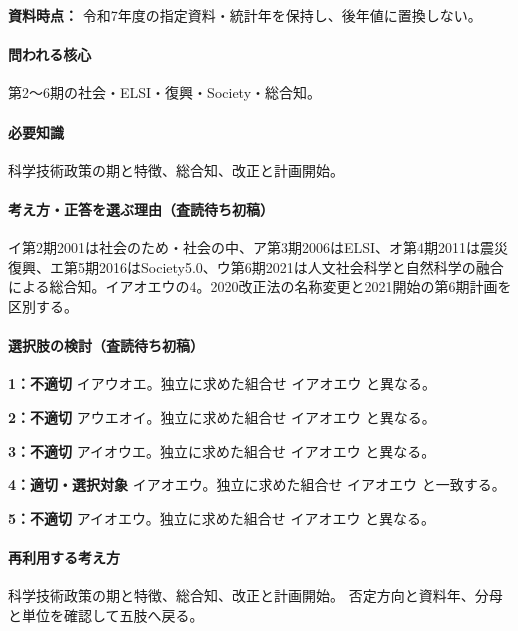 \noindent\textbf{資料時点：} 令和7年度の指定資料・統計年を保持し、後年値に置換しない。\par

\paragraph{問われる核心} 第2〜6期の社会・ELSI・復興・Society・総合知。

\paragraph{必要知識} 科学技術政策の期と特徴、総合知、改正と計画開始。

\paragraph{考え方・正答を選ぶ理由（査読待ち初稿）} イ第2期2001は社会のため・社会の中、ア第3期2006はELSI、オ第4期2011は震災復興、エ第5期2016はSociety5.0、ウ第6期2021は人文社会科学と自然科学の融合による総合知。イアオエウの4。2020改正法の名称変更と2021開始の第6期計画を区別する。

\paragraph{選択肢の検討（査読待ち初稿）}\mbox{}\par

\noindent\textbf{1：不適切} イアウオエ。独立に求めた組合せ イアオエウ と異なる。\par

\noindent\textbf{2：不適切} アウエオイ。独立に求めた組合せ イアオエウ と異なる。\par

\noindent\textbf{3：不適切} アイオウエ。独立に求めた組合せ イアオエウ と異なる。\par

\noindent\textbf{4：適切・選択対象} イアオエウ。独立に求めた組合せ イアオエウ と一致する。\par

\noindent\textbf{5：不適切} アイオエウ。独立に求めた組合せ イアオエウ と異なる。\par

\paragraph{再利用する考え方} 科学技術政策の期と特徴、総合知、改正と計画開始。 否定方向と資料年、分母と単位を確認して五肢へ戻る。

